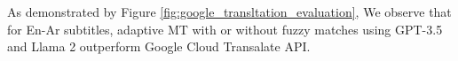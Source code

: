 \documentclass[twocolumn]{article}
\begin{document}
As demonstrated by Figure \ref{fig:google_transltation_evaluation}, We observe that for En-Ar subtitles, adaptive MT with or without fuzzy matches using GPT-3.5 and Llama 2 outperform Google Cloud Transalate API.



%
%
%
%
%
	
\end{document}
